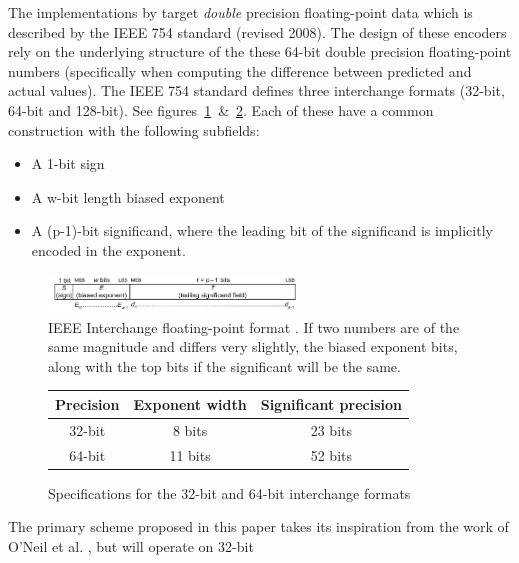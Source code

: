 The implementations by \cite{O'Neil:2011:FDC:1964179.1964189,1607248,4589203,4976448,engelson2000lossless} target \textit{double} precision floating-point data which is described by the IEEE 754 standard (revised 2008).
The design of these encoders rely on the underlying structure of the these 64-bit double precision floating-point numbers (specifically when computing the difference between predicted and actual values). The IEEE 754 standard defines three 
interchange formats (32-bit, 64-bit and 128-bit). See figures~\ref{IEEE_FLOAT}~\&~\ref{IEEE_FLOAT_TAB}. Each of these have a common construction with the following subfields:
\begin{itemize}
 \item A 1-bit sign
 \item A w-bit length biased exponent
 \item A (p-1)-bit significand, where the leading bit of the significand is implicitly encoded in the exponent.
\end{itemize}
\begin{figure}[h!]
  \begin{mdframed}
  \centering
  \includegraphics[width=0.6\textwidth]{IEEEinterchangeFormat.png}
  \caption[IEEE Interchange floating-point format]{IEEE Interchange floating-point format \cite{4610935}. If two numbers are of the same magnitude and differs very slightly, the biased exponent bits, along with the
  top bits if the significant will be the same.}
  \label{IEEE_FLOAT}
  \end{mdframed}
\end{figure}
\begin{figure}[h!]
\begin{mdframed}
\centering
\begin{tabular}{|c|c|c|}
 \hline
 Precision & Exponent width & Significant precision \\
 \hline
 32-bit & 8 bits & 23 bits \\
 \hline
 64-bit & 11 bits & 52 bits \\
 \hline
\end{tabular}
\caption[IEEE Interchange floating-point 32- and 64-bit format specifications]{Specifications for the 32-bit and 64-bit interchange formats}
 \label{IEEE_FLOAT_TAB}
\end{mdframed}
\end{figure}
The primary scheme proposed in this paper takes its inspiration from the work of O'Neil et al. \cite{O'Neil:2011:FDC:1964179.1964189}, but will operate on 32-bit 
